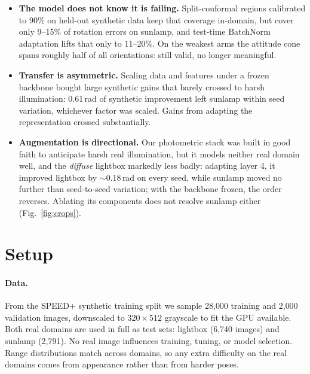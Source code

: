 \documentclass{article}
\begin{document}
\begin{itemize}[leftmargin=1.4em,itemsep=1pt,topsep=2pt]
  \item \textbf{The model does not know it is failing.} Split-conformal regions
  calibrated to 90\% on held-out synthetic data keep that coverage in-domain, but cover
  only 9--15\% of rotation errors on sunlamp, and test-time BatchNorm adaptation
  lifts that only to 11--20\%. On the weakest arms the attitude cone
  spans roughly half of all orientations: still valid, no longer meaningful.
  \item \textbf{Transfer is asymmetric.} Scaling data and features under a frozen
  backbone bought large synthetic gains that barely crossed to harsh illumination:
  0.61\,rad of synthetic improvement left sunlamp within seed variation, whichever
  factor was scaled. Gains from adapting
  the representation crossed substantially.
  \item \textbf{Augmentation is directional.} Our photometric stack was built in
  good faith to anticipate harsh real illumination, but it models neither real
  domain well, and the \emph{diffuse} lightbox markedly less badly:
  adapting layer 4, it improved lightbox by ${\sim}0.18$\,rad on every seed, while sunlamp moved no
  further than seed-to-seed variation; with the backbone frozen, the order reverses. Ablating its components does not resolve
  sunlamp either (Fig.~\ref{fig:crops}).
\end{itemize}

\section{Setup}
\label{sec:setup}

\paragraph{Data.} From the SPEED+ synthetic training split we sample 28{,}000 training
and 2{,}000 validation images, downscaled to $320{\times}512$ grayscale to fit the GPU
available. Both real domains are used in full as test sets: lightbox (6{,}740 images) and
sunlamp (2{,}791). No real image influences training, tuning, or model selection. Range
distributions match across domains, so any extra difficulty on the real domains comes
from appearance rather than from harder poses.
\end{document}
